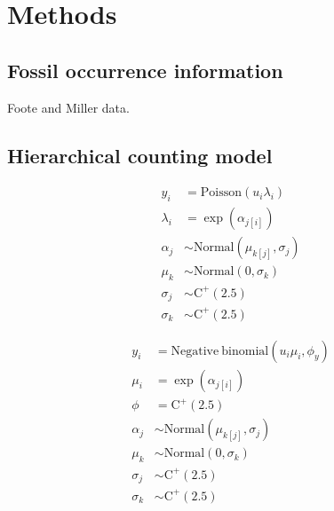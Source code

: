 \documentclass[12pt,letterpaper]{article}
\begin{document}
\section{Methods}

\subsection{Fossil occurrence information}
Foote and Miller data.

\subsection{Hierarchical counting model}
\begin{align}
  y_{i} &= \mathrm{Poisson}(u_{i}\lambda_{i}) \\
  \lambda_{i} &= \exp(\alpha_{j[i]}) \\
  \alpha_{j} &\sim \mathrm{Normal}(\mu_{k[j]}, \sigma_{j}) \\
  \mu_{k} &\sim \mathrm{Normal}(0, \sigma_{k}) \\
  \sigma_{j} &\sim \mathrm{C^{+}}(2.5) \\
  \sigma_{k} &\sim \mathrm{C^{+}}(2.5)
\end{align}

\begin{align}
  y_{i} &= \mathrm{Negative\ binomial}(u_{i}\mu_{i}, \phi_{y}) \\
  \mu_{i} &= \exp(\alpha_{j[i]}) \\
  \phi &= \mathrm{C^{+}}(2.5) \\
  \alpha_{j} &\sim \mathrm{Normal}(\mu_{k[j]}, \sigma_{j}) \\
  \mu_{k} &\sim \mathrm{Normal}(0, \sigma_{k}) \\
  \sigma_{j} &\sim \mathrm{C^{+}}(2.5) \\
  \sigma_{k} &\sim \mathrm{C^{+}}(2.5)
\end{align}
\end{document}

